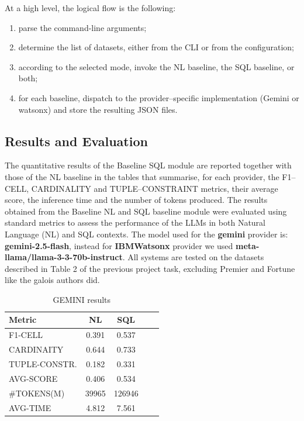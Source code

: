 \documentclass[12pt,a4paper]{article}
\begin{document}
At a high level, the logical flow is the following:
\begin{enumerate}
  \item parse the command-line arguments;
  \item determine the list of datasets, either from the CLI or from the
  configuration;
  \item according to the selected mode, invoke the NL baseline, the SQL
  baseline, or both;
  \item for each baseline, dispatch to the provider--specific implementation
  (Gemini or watsonx) and store the resulting JSON files.
\end{enumerate}


\subsection{Results and Evaluation}
The quantitative results of the Baseline SQL module are reported together with
those of the NL baseline in the tables that summarise, for each provider, the
F1--CELL, CARDINALITY and TUPLE--CONSTRAINT metrics, their average score, the
 inference time and the number of tokens produced.
The results obtained from the Baseline NL and SQL baseline module were evaluated using standard metrics to assess the performance of the LLMs in both Natural Language (NL) and SQL contexts.
The model used for the \textbf{gemini} provider is: \textbf{gemini-2.5-flash}, instead for \textbf{IBMWatsonx} provider we used \textbf{meta-llama/llama-3-3-70b-instruct}.
All systems are tested on the datasets described in Table 2 of the previous project task, excluding Premier and Fortune like the galois authors did.



\begin{table}[h]
\centering
\begin{tabular}{lcccc}
\toprule
\textbf{Metric} & \textbf{NL} & \textbf{SQL}  \\
\midrule
F1-CELL & 0.391 & 0.537  \\
CARDINAITY & 0.644 & 0.733  \\
TUPLE-CONSTR. & 0.182 & 0.331  \\
AVG-SCORE & 0.406 & 0.534  \\
\#TOKENS(M) & 39965 & 126946  \\
AVG-TIME & 4.812 & 7.561  \\

\bottomrule
\end{tabular}
\caption{GEMINI results}
\label{gemini_results}
\end{table}
\end{document}
